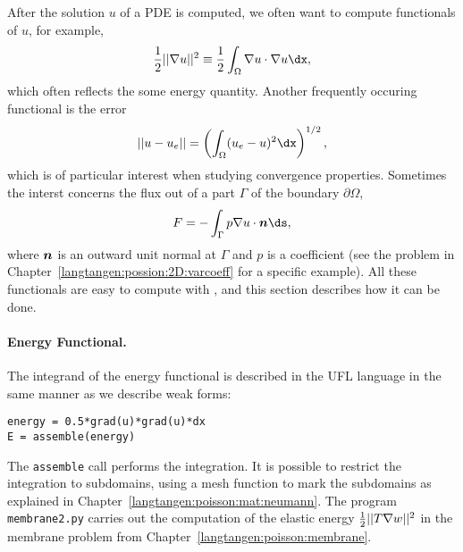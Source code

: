 After the solution $u$ of a PDE is computed, we often want to compute
functionals of $u$, for example, 
\begin{equation}
{1\over2}||\nabla u||^2 \equiv {1\over2}\int_\Omega \nabla u\cdot \nabla u\dx,
\label{langtangen:poisson1:functionals:energy}
\end{equation}
which often reflects the some energy quantity.
Another frequently occuring functional is the error 
\begin{equation}
||u-u_e|| = \left(\int_\Omega (u_e-u)^2\dx\right)^{1/2},
\label{langtangen:poisson1:functionals:error}
\end{equation}
which is of particular interest when studying convergence properties.
Sometimes the interst concerns the flux out of a part $\Gamma$ of
the boundary $\partial\Omega$,
\begin{equation}
F = -\int_\Gamma p\nabla u\cdot\langtangennormalvec\ds,
\label{langtangen:poisson1:functionals:flux}
\end{equation}
where ${\mbox{\boldmath $n$}}$ is an outward unit normal at $\Gamma$ and $p$ is a
coefficient (see the problem in Chapter~\ref{langtangen:possion:2D:varcoeff}
for a specific example).
All these functionals are easy to compute with \fenics, and this section
describes how it can be done.

\paragraph{Energy Functional.}
The integrand of the
energy functional 
is described in the UFL language in the same manner as we describe
weak forms:
\begin{Verbatim}[fontsize=\fontsize{10pt}{10pt},tabsize=8,baselinestretch=1.05,
fontfamily=tt,xleftmargin=7mm]
energy = 0.5*grad(u)*grad(u)*dx
E = assemble(energy)
\end{Verbatim}
\noindent
The {\fontsize{12pt}{12pt}\texttt{assemble}} call performs the integration.
It is possible to restrict the integration to subdomains, using
a mesh function to mark the subdomains as explained in
Chapter~\ref{langtangen:poisson:mat:neumann}.
The program {\fontsize{12pt}{12pt}\texttt{membrane2.py}} carries out the computation of
the elastic energy ${1\over2}||T\nabla w||^2$ in the membrane problem from
Chapter~\ref{langtangen:poisson:membrane}.

